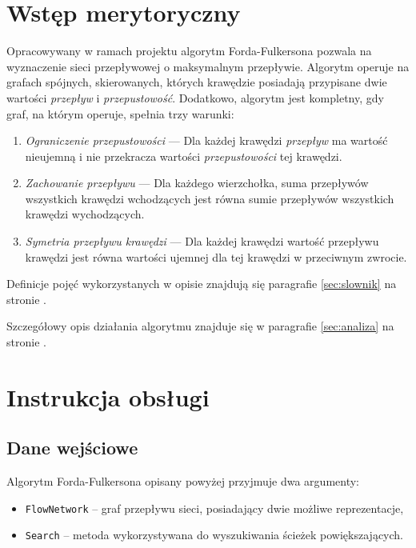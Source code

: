 \documentclass[10pt]{dokument-tiwo}
\begin{document}
\MakeDokumentMeta


\section{Wstęp merytoryczny}

Opracowywany w ramach projektu algorytm Forda-Fulkersona pozwala na wyznaczenie
sieci przepływowej o maksymalnym przepływie. Algorytm operuje na grafach
spójnych, skierowanych, których krawędzie posiadają przypisane dwie wartości
\emph{przepływ} i \emph{przepustowość}. Dodatkowo, algorytm jest kompletny, gdy
graf, na którym operuje, spełnia trzy warunki:

\begin{enumerate}
    \item \emph{Ograniczenie przepustowości} --- Dla każdej krawędzi
    \emph{przepływ} ma wartość nieujemną i nie przekracza wartości
    \emph{przepustowości} tej krawędzi.
    \item \emph{Zachowanie przepływu} --- Dla każdego wierzchołka, suma
    przepływów wszystkich krawędzi wchodzących jest równa sumie przepływów
    wszystkich krawędzi wychodzących.
    \item \emph{Symetria przepływu krawędzi} --- Dla każdej krawędzi wartość
    przepływu krawędzi jest równa wartości ujemnej dla tej krawędzi w
    przeciwnym zwrocie.
\end{enumerate}

\noindent
Definicje pojęć wykorzystanych w opisie znajdują się paragrafie
\ref{sec:slownik} na stronie \pageref{sec:slownik}.

\noindent
Szczegółowy opis działania algorytmu znajduje się w paragrafie \ref{sec:analiza}
na stronie \pageref{sec:analiza}.


\section{Instrukcja obsługi}

\subsection{Dane wejściowe}
Algorytm Forda-Fulkersona opisany powyżej przyjmuje dwa argumenty:
\begin{itemize}[nosep]
  \item \texttt{FlowNetwork} -- graf przepływu sieci, posiadający dwie możliwe
  reprezentacje,
  \item \texttt{Search} -- metoda wykorzystywana do wyszukiwania ścieżek
  powiększających.
\end{itemize}
\end{document}
